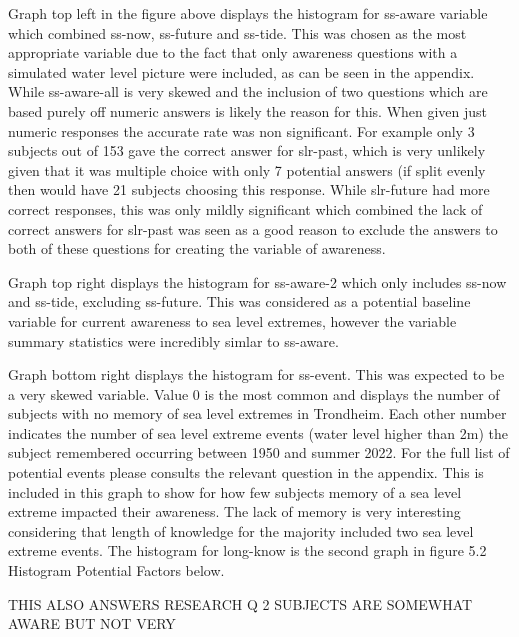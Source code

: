 Graph top left in the figure above displays the histogram for ss-aware variable which combined ss-now, ss-future and ss-tide. This was chosen as the most appropriate variable due to the fact that only awareness questions with a simulated water level picture were included, as can be seen in the appendix. While ss-aware-all is very skewed and the inclusion of two questions which are based purely off numeric answers is likely the reason for this. When given just numeric responses the accurate rate was non significant. For example only 3 subjects out of 153 gave the correct answer for slr-past, which is very unlikely given that it was multiple choice with only 7 potential answers (if split evenly then would have 21 subjects choosing this response. While slr-future had more correct responses, this was only mildly significant which combined the lack of correct answers for slr-past was seen as a good reason to exclude the answers to both of these questions for creating the variable of awareness. 

Graph top right displays the histogram for ss-aware-2 which only includes ss-now and ss-tide, excluding ss-future. This was considered as a potential baseline variable for current awareness to sea level extremes, however the variable summary statistics were incredibly simlar to ss-aware.

Graph bottom right displays the histogram for ss-event. This was expected to be a very skewed variable. Value 0 is the most common and displays the number of subjects with no memory of sea level extremes in Trondheim. Each other number indicates the number of sea level extreme events (water level higher than 2m) the subject remembered occurring between 1950 and summer 2022. For the full list of potential events please consults the relevant question in the appendix. This is included in this graph to show for how few subjects memory of a sea level extreme impacted their awareness. The lack of memory is very interesting considering that length of knowledge for the majority included two sea level extreme events. The histogram for long-know is the second graph in figure 5.2 Histogram Potential Factors below.

THIS ALSO ANSWERS RESEARCH Q 2
SUBJECTS ARE SOMEWHAT AWARE BUT NOT VERY


